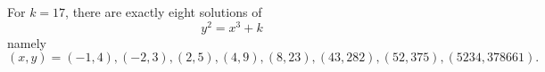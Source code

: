 \begin{proposition}
    For $k=17$, there are exactly eight solutions of
\[
    y^2=x^3+k
\]
    namely
\[
    (x,y)=(-1,4),(-2,3),(2,5),(4,9),(8,23),(43,282),(52,375),(5234,378661).
\]
\end{proposition}
